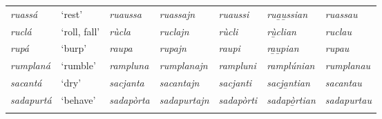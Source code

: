 \begin{sidewaystable}
\begin{tabularx}{\textwidth}{lllllll}
		\textit{ruassá} &`rest' & \textit{ruaussa} & \textit{ruassajn} & \textit{ruaussi} & \textit{rua̱u̱ssian} & \textit{ruassau}\\
		\textit{ruclá} & `roll, fall' & \textit{rùcla} & \textit{ruclajn} & \textit{rùcli} & \textit{rù̱clian} & \textit{ruclau}\\
		\textit{rupá} & `burp' & \textit{raupa} & \textit{rupajn} & \textit{raupi} & \textit{ra̱u̱pian} & \textit{rupau}\\
		\textit{rumplaná} & `rumble' & \textit{rampluna} & \textit{rumplanajn} & \textit{rampluni} & \textit{ramplúnian} & \textit{rumplanau} \\
		\textit{sacantá} & ‘dry’ & \textit{sacjanta} & \textit{sacantajn} & \textit{sacjanti} & \textit{sacj̱a̱ntian} & \textit{sacantau}\\
		\textit{sadapurtá} & ‘behave’ & \textit{sadapòrta} & \textit{sadapurtajn} & \textit{sadapòrti} & \textit{sadapò̱rtian} & \textit{sadapurtau}\\
			\lspbottomrule
		\end{tabularx} 
\end{sidewaystable}


